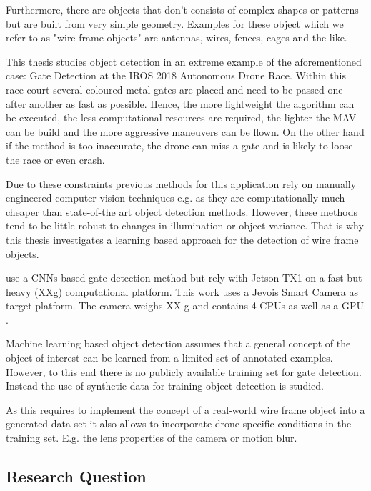 Furthermore, there are objects that don't consists of complex shapes or patterns but are built from very simple geometry. Examples for these object which we refer to as "wire frame objects" are antennas, wires, fences, cages and the like.  

This thesis studies object detection in an extreme example of the aforementioned case: Gate Detection at the IROS 2018 Autonomous Drone Race. Within this race court several coloured metal gates are placed and need to be passed one after another as fast as possible. Hence, the more lightweight the algorithm can be executed, the less computational resources are required, the lighter the \ac{MAV} can be build and the more aggressive maneuvers can be flown. On the other hand if the method is too inaccurate, the drone can miss a gate and is likely to loose the race or even crash.

Due to these constraints previous methods for this application rely on manually engineered computer vision techniques e.g. as they are computationally much cheaper than state-of-the art object detection methods. However, these methods tend to be little robust to changes in illumination or object variance. That is why this thesis investigates a learning based approach for the detection of wire frame objects.

 use a \acp{CNN}-based gate detection method but rely with Jetson TX1 on a fast but heavy (XXg) computational platform. This work uses a Jevois Smart Camera  as target platform. The camera weighs XX g and contains 4 CPUs as well as a GPU .

Machine learning based object detection assumes that a general concept of the object of interest can be learned from a limited set of annotated examples. However,  to this end there is no publicly available training set for gate detection. Instead the use of synthetic data for training object detection is studied. 

As this requires to implement the concept of a real-world wire frame object into a generated data set it also allows to incorporate drone specific conditions in the training set. E.g. the lens properties of the camera or motion blur.

\subsection*{Research Question}

